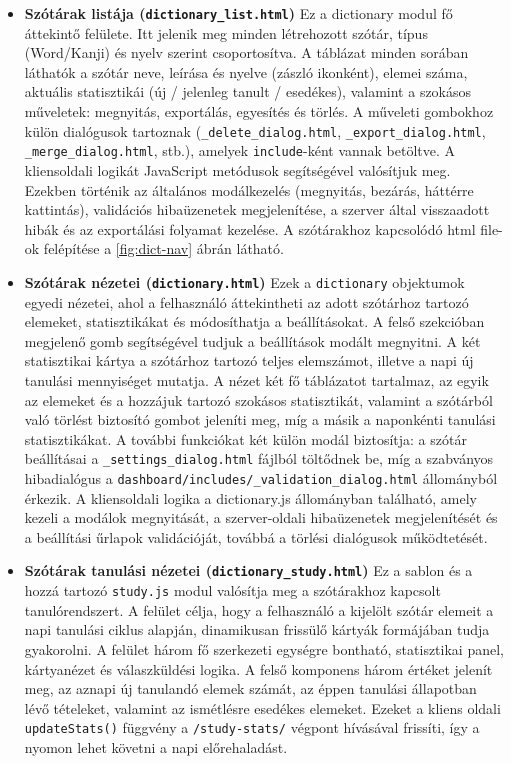 \begin{itemize}
  \item \textbf{Szótárak listája (\texttt{dictionary\_list.html})}
  Ez a dictionary modul fő áttekintő felülete. Itt jelenik meg minden létrehozott szótár, típus (Word/Kanji) és nyelv szerint csoportosítva. A táblázat minden sorában láthatók a szótár neve, leírása és nyelve (zászló ikonként), elemei száma, aktuális statisztikái (új / jelenleg tanult / esedékes), valamint a szokásos műveletek: megnyitás, exportálás, egyesítés és törlés. A műveleti gombokhoz külön dialógusok tartoznak (\texttt{\_delete\_dialog.html}, \texttt{\_export\_dialog.html}, \texttt{\_merge\_dialog.html}, stb.), amelyek \texttt{include}-ként vannak betöltve. A kliensoldali logikát JavaScript metódusok segítségével valósítjuk meg. Ezekben történik az általános modálkezelés (megnyitás, bezárás, háttérre kattintás), validációs hibaüzenetek megjelenítése, a szerver által visszaadott hibák és az exportálási folyamat kezelése. A szótárakhoz kapcsolódó html file-ok felépítése a \ref{fig:dict-nav} ábrán látható.

  \item \textbf{Szótárak nézetei (\texttt{dictionary.html})}
  Ezek a \texttt{dictionary} objektumok egyedi nézetei, ahol a felhasználó áttekintheti az adott szótárhoz tartozó elemeket, statisztikákat és módosíthatja a beállításokat. A felső szekcióban megjelenő gomb segítségével tudjuk a beállítások modált megnyitni. A két statisztikai kártya a szótárhoz tartozó teljes elemszámot, illetve a napi új tanulási mennyiséget mutatja. A nézet két fő táblázatot tartalmaz, az egyik az elemeket és a hozzájuk tartozó szokásos statisztikát, valamint a szótárból való törlést biztosító gombot jeleníti meg, míg a másik a naponkénti tanulási statisztikákat. A további funkciókat két külön modál biztosítja: a szótár beállításai a \texttt{\_settings\_dialog.html} fájlból töltődnek be, míg a szabványos hibadialógus a \texttt{dashboard/includes/\_validation\_dialog.html} állományból érkezik. A kliensoldali logika a dictionary.js állományban található, amely kezeli a modálok megnyitását, a szerver-oldali hibaüzenetek megjelenítését és a beállítási űrlapok validációját, továbbá a törlési dialógusok működtetését.

  \item \textbf{Szótárak tanulási nézetei (\texttt{dictionary\_study.html})}
  Ez a sablon és a hozzá tartozó \texttt{study.js} modul valósítja meg a szótárakhoz kapcsolt tanulórendszert. A felület célja, hogy a felhasználó a kijelölt szótár elemeit a napi tanulási ciklus alapján, dinamikusan frissülő kártyák formájában tudja gyakorolni. A felület három fő szerkezeti egységre bontható, statisztikai panel, kártyanézet és válaszküldési logika. A felső komponens három értéket jelenít meg, az aznapi új tanulandó elemek számát, az éppen tanulási állapotban lévő tételeket, valamint az ismétlésre esedékes elemeket. Ezeket a kliens oldali \texttt{updateStats()} függvény a \texttt{/study-stats/} végpont hívásával frissíti, így a nyomon lehet követni a napi előrehaladást. 
    

\end{itemize}
